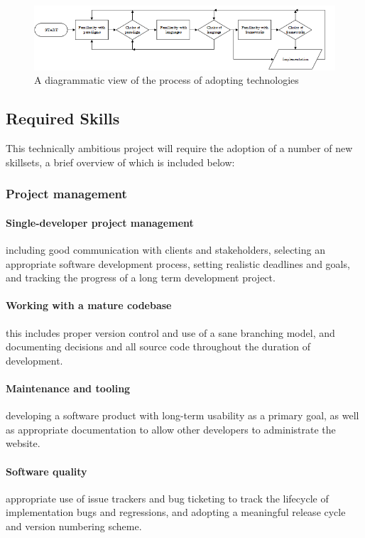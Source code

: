 \documentclass[12pt,a4paper]{article}
\begin{document}
\begin{figure}[H]
\centering
\includegraphics{assets/flow-tech-choices.png}
\caption{A diagrammatic view of the process of adopting technologies}
\label{fig:flow-tech-choices}
\end{figure}

\subsection{Required Skills}
This technically ambitious project will require the adoption of a number of new
skillsets, a brief overview of which is included below:

\subsubsection{Project management}

\paragraph{Single-developer project management} including good communication
with clients and stakeholders, selecting an appropriate software development
process, setting realistic deadlines and goals, and tracking the progress of a
long term development project.

\paragraph{Working with a mature codebase} this includes proper version control
and use of a sane branching model, and documenting decisions and all source code
throughout the duration of development.

\paragraph{Maintenance and tooling} developing a software product with long-term
usability as a primary goal, as well as appropriate documentation to allow other
developers to administrate the website.

\paragraph{Software quality} appropriate use of issue trackers and bug ticketing
to track the lifecycle of implementation bugs and regressions, and adopting a
meaningful release cycle and version numbering scheme.
\end{document}

